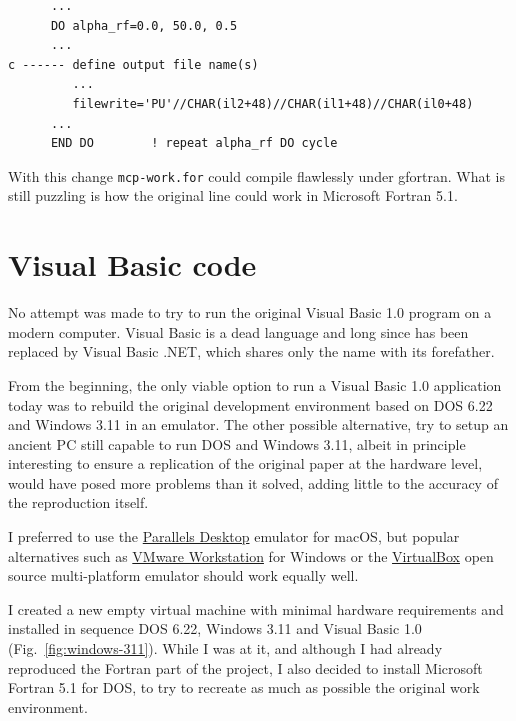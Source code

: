 \begin{verbatim}
      ...
      DO alpha_rf=0.0, 50.0, 0.5
      ...
c ------ define output file name(s)
         ...
         filewrite='PU'//CHAR(il2+48)//CHAR(il1+48)//CHAR(il0+48)
      ...
      END DO        ! repeat alpha_rf DO cycle
\end{verbatim}

With this change \texttt{mcp-work.for} could compile flawlessly under gfortran.
What is still puzzling is how the original line could work in Microsoft Fortran 5.1.



\section{Visual Basic code}
\label{visual-basic-code}

No attempt was made to try to run the original Visual Basic 1.0 program on a modern computer. Visual Basic is a dead language and long since has been replaced by Visual Basic .NET, which shares only the name with its forefather.
 
From the beginning, the only viable option to run a Visual Basic 1.0 application today was to rebuild the original development environment based on DOS 6.22 and Windows 3.11 in an emulator.
The other possible alternative, try to setup an ancient PC still capable to run DOS and Windows 3.11, albeit in principle interesting to ensure a replication of the original paper at the hardware level, would have posed more problems than it solved, adding little to the accuracy of the reproduction itself.

I preferred to use the \href{https://www.parallels.com/}{Parallels Desktop} emulator for macOS, but popular alternatives such as \href{https://www.vmware.com/products/workstation-player.html}{VMware Workstation} for Windows or the \href{https://www.virtualbox.org/}{VirtualBox} open source multi-platform emulator should work equally well.

I created a new empty virtual machine with minimal hardware requirements and installed in sequence DOS 6.22, Windows 3.11 and Visual Basic 1.0 (Fig.~\ref{fig:windows-311}).
While I was at it, and although I had already reproduced the Fortran part of the project, I also decided to install Microsoft Fortran 5.1 for DOS, to try to recreate as much as possible the original work environment.

